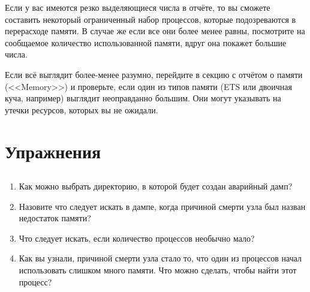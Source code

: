 Если у вас имеются резко выделяющиеся числа в отчёте, то вы сможете составить некоторый ограниченный набор процессов, которые подозреваются в перерасходе памяти. В случае же если все они более менее равны, посмотрите на сообщаемое количество использованной памяти, вдруг она покажет большие числа.

Если всё выглядит более-менее разумно, перейдите в секцию с отчётом о памяти (<<Memory>>) и проверьте, если один из типов памяти (ETS или двоичная куча, например) выглядит неоправданно большим. Они могут указывать на утечки ресурсов, которых вы не ожидали.


\section{Упражнения}

\subsection*{\ReviewTitle{}}

\begin{enumerate}
	\item Как можно выбрать директорию, в которой будет создан аварийный дамп?
	\item Назовите что следует искать в дампе, когда причиной смерти узла был назван недостаток памяти?
	\item Что следует искать, если количество процессов необычно мало?
	\item Как вы узнали, причиной смерти узла стало то, что один из процессов начал использовать слишком много памяти. Что можно сделать, чтобы найти этот процесс?
\end{enumerate}

